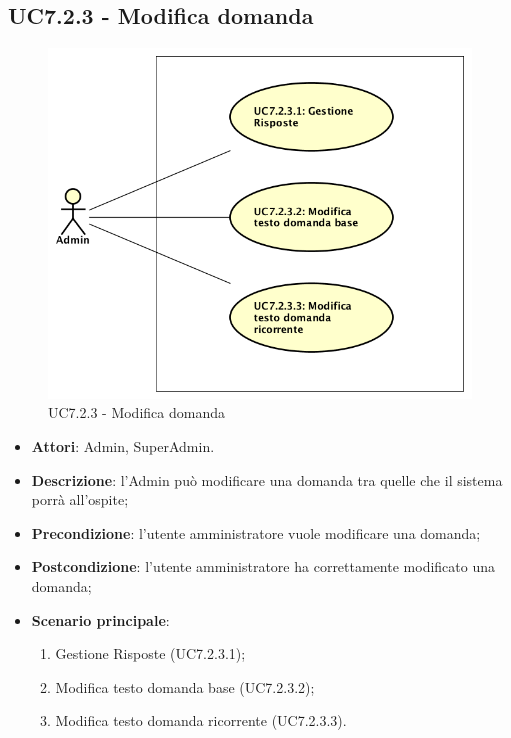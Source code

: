 \documentclass[../AnalisiDeiRequisiti_v4.0.0.tex]{subfiles}
\begin{document}
\subsection{UC7.2.3 - Modifica domanda} 
\label{sssec:UC7.2.3} 
\begin{figure}[!h]
	\centering
	\includegraphics[scale=0.7]{UseCases/UC7_GestionePannelloAdmin/UC7_2_GestioneDomande/UC7_2_3_ModificaDomanda/UC7_2_3_ModificaDomanda.png}
	\caption{UC7.2.3 - Modifica domanda}
\end{figure}
\begin{itemize} 
\item \textbf{Attori}: Admin, SuperAdmin.
\item \textbf{Descrizione}: l'Admin può modificare una domanda tra quelle che il sistema porrà all'ospite;
\item \textbf{Precondizione}: l'utente amministratore vuole modificare una domanda;
\item \textbf{Postcondizione}: l'utente amministratore ha correttamente modificato una domanda;
\item \textbf{Scenario principale}: \begin{enumerate}\item Gestione Risposte (UC7.2.3.1);\item Modifica testo domanda base (UC7.2.3.2);\item Modifica testo domanda ricorrente (UC7.2.3.3).
\end{enumerate}
\end{itemize} 
\newpage
\end{document}
